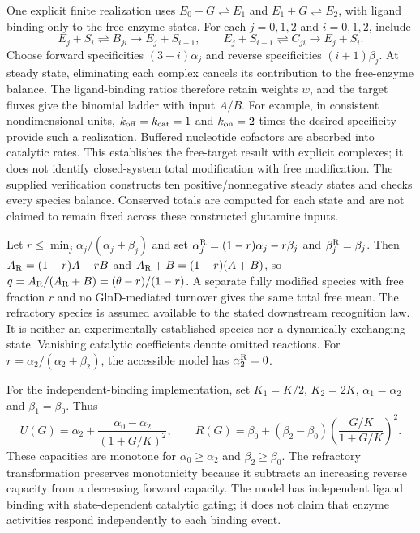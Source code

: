 \documentclass[11pt]{article}
\begin{document}
One explicit finite realization uses $E_0+G\rightleftharpoons E_1$ and $E_1+G\rightleftharpoons E_2$, with ligand binding only to the free enzyme states. For each $j=0,1,2$ and $i=0,1,2$, include
\[
E_j+S_i\rightleftharpoons B_{ji}\longrightarrow E_j+S_{i+1},\qquad
E_j+S_{i+1}\rightleftharpoons C_{ji}\longrightarrow E_j+S_i.
\]
Choose forward specificities $(3-i)\alpha_j$ and reverse specificities $(i+1)\beta_j$. At steady state, eliminating each complex cancels its contribution to the free-enzyme balance. The ligand-binding ratios therefore retain weights $w$, and the target fluxes give the binomial ladder with input $A/B$. For example, in consistent nondimensional units, $k_{\rm off}=k_{\rm cat}=1$ and $k_{\rm on}=2$ times the desired specificity provide such a realization. Buffered nucleotide cofactors are absorbed into catalytic rates. This establishes the free-target result with explicit complexes; it does not identify closed-system total modification with free modification. The supplied verification constructs ten positive/nonnegative steady states and checks every species balance. Conserved totals are computed for each state and are not claimed to remain fixed across these constructed glutamine inputs.

Let $r\le\min_j \alpha_j/(\alpha_j+\beta_j)$ and set $\alpha_j^{\rm R}=(1-r)\alpha_j-r\beta_j$ and $\beta_j^{\rm R}=\beta_j$. Then $A_{\rm R}=(1-r)A-rB$ and $A_{\rm R}+B=(1-r)(A+B)$, so $q=A_{\rm R}/(A_{\rm R}+B)=(\theta-r)/(1-r)$. A separate fully modified species with free fraction $r$ and no GlnD-mediated turnover gives the same total free mean. The refractory species is assumed available to the stated downstream recognition law. It is neither an experimentally established species nor a dynamically exchanging state. Vanishing catalytic coefficients denote omitted reactions. For $r=\alpha_2/(\alpha_2+\beta_2)$, the accessible model has $\alpha_2^{\rm R}=0$.

For the independent-binding implementation, set $K_1=K/2$, $K_2=2K$, $\alpha_1=\alpha_2$ and $\beta_1=\beta_0$. Thus
\[
U(G)=\alpha_2+\frac{\alpha_0-\alpha_2}{(1+G/K)^2},\qquad
R(G)=\beta_0+(\beta_2-\beta_0)\left(\frac{G/K}{1+G/K}\right)^2.
\]
These capacities are monotone for $\alpha_0\ge\alpha_2$ and $\beta_2\ge\beta_0$. The refractory transformation preserves monotonicity because it subtracts an increasing reverse capacity from a decreasing forward capacity. The model has independent ligand binding with state-dependent catalytic gating; it does not claim that enzyme activities respond independently to each binding event.
\end{document}

